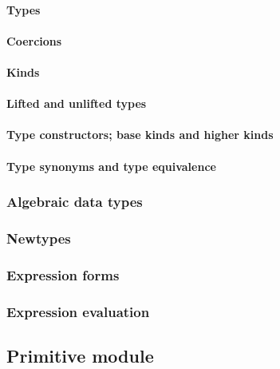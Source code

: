 \paragraph{Types}

\paragraph{Coercions}

\paragraph{Kinds}

\paragraph{Lifted and unlifted types}

\paragraph{Type constructors; base kinds and higher kinds}

\paragraph{Type synonyms and type equivalence}

\subsubsection{Algebraic data types}


\subsubsection{Newtypes}


\subsubsection{Expression forms}


\subsubsection{Expression evaluation}


\subsection{Primitive module}

